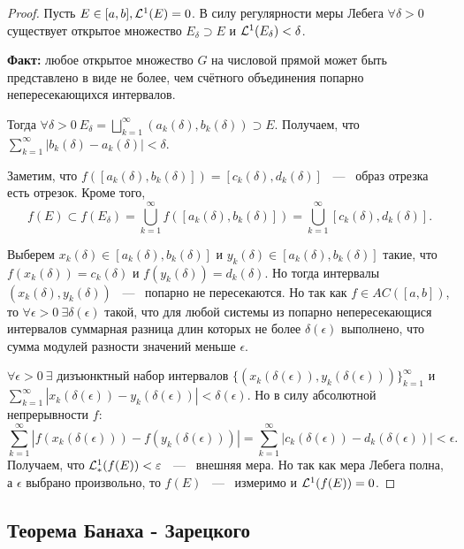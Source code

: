 \begin{proof}
	Пусть $E \in [a, b], \mathcal{L}^1(E) = 0$. В силу регулярности меры Лебега $\forall \delta > 0$ существует открытое множество $E_{\delta} \supset E$ и $\mathcal{L}^1(E_\delta) < \delta$.

	\noindent \textbf{Факт:} любое открытое множество $G$ на числовой прямой может быть представлено в виде не более, чем счётного объединения попарно непересекающихся интервалов.

	\noindent Тогда $\forall \delta > 0 \  E_{\delta} = \bigsqcup\limits_{k = 1}^{\infty} (a_k(\delta), b_k(\delta)) \supset E$. Получаем, что $\sum\limits_{k = 1}^{\infty} |b_k(\delta) - a_k(\delta)| < \delta$.

	\noindent Заметим, что $f([a_k(\delta), b_k(\delta)]) = [c_k(\delta), d_k(\delta)]$ ~---~ образ отрезка есть отрезок. Кроме того, $$f(E) \subset f(E_{\delta}) = \bigcup\limits_{k = 1}^{\infty} f([a_k(\delta), b_k(\delta)]) = \bigcup\limits_{k = 1}^{\infty} [c_k(\delta), d_k(\delta)].$$

	\noindent Выберем $x_k(\delta) \in [a_k(\delta), b_k(\delta)]$ и $y_k(\delta) \in [a_k(\delta), b_k(\delta)]$ такие, что $f(x_k(\delta)) = c_k(\delta)$ и $f(y_k(\delta)) = d_k(\delta)$. Но тогда интервалы $(x_k(\delta), y_k(\delta))$ ~---~ попарно не пересекаются. Но так как $f \in AC([a, b])$, то $\forall \epsilon > 0 \ \exists \delta(\epsilon)$ такой, что для любой системы из попарно непересекающися интервалов суммарная разница длин которых не более $\delta(\epsilon)$ выполнено, что сумма модулей разности значений меньше $\epsilon$.

	\noindent $\forall \epsilon > 0 \ \exists$ дизъюнктный набор интервалов $\{(x_k(\delta(\epsilon)), y_k(\delta(\epsilon)))\}_{k = 1}^{\infty}$ и $\sum\limits_{k = 1}^{\infty} \left|x_k(\delta(\epsilon)) - y_k(\delta(\epsilon))\right| < \delta(\epsilon)$. Но в силу абсолютной непрерывности $f$:  $$\sum\limits_{k = 1}^{\infty} |f(x_k(\delta(\epsilon))) - f(y_k(\delta(\epsilon)))| = \sum\limits_{k = 1}^{\infty} |c_k(\delta(\epsilon)) - d_k(\delta(\epsilon))| < \epsilon.$$ Получаем, что $\mathcal{L}^{1}_{*}(f(E)) < \varepsilon$ ~---~ внешняя мера. Но так как мера Лебега полна, а $\epsilon$ выбрано произвольно, то $f(E)$ ~---~ измеримо и $\mathcal{L}^1(f(E)) = 0$.
\end{proof}

\subsection{Теорема Банаха - Зарецкого}

